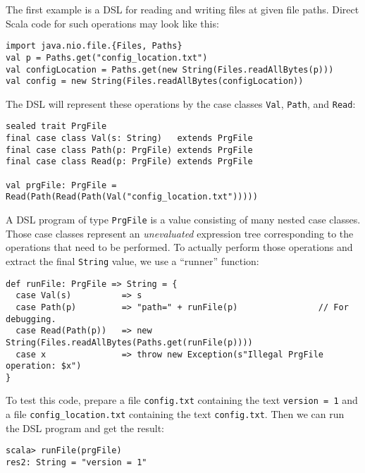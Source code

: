 The first example is a DSL for reading and writing files at given
file paths. Direct Scala code for such operations may look like this:
\begin{lstlisting}
import java.nio.file.{Files, Paths}
val p = Paths.get("config_location.txt")
val configLocation = Paths.get(new String(Files.readAllBytes(p)))
val config = new String(Files.readAllBytes(configLocation))
\end{lstlisting}
The DSL will represent these operations by the case classes \lstinline!Val!,
\lstinline!Path!, and \lstinline!Read!:
\begin{lstlisting}
sealed trait PrgFile
final case class Val(s: String)   extends PrgFile
final case class Path(p: PrgFile) extends PrgFile
final case class Read(p: PrgFile) extends PrgFile

val prgFile: PrgFile = Read(Path(Read(Path(Val("config_location.txt")))))
\end{lstlisting}
A DSL program of type \lstinline!PrgFile!
is a value consisting of many nested case classes. Those case classes
represent an \emph{unevaluated} expression tree corresponding to the
operations that need to be performed. To actually perform those operations
and extract the final \lstinline!String!
value, we use a \textsf{``}runner\textsf{''} function:
\begin{lstlisting}
def runFile: PrgFile => String = {
  case Val(s)          => s
  case Path(p)         => "path=" + runFile(p)                // For debugging.
  case Read(Path(p))   => new String(Files.readAllBytes(Paths.get(runFile(p))))
  case x               => throw new Exception(s"Illegal PrgFile operation: $x")
}
\end{lstlisting}
To test this code, prepare a file \lstinline!config.txt!
containing the text \lstinline!version = 1!
and a file \lstinline!config_location.txt!
containing the text \lstinline!config.txt!.
Then we can run the DSL program and get the result:
\begin{lstlisting}
scala> runFile(prgFile)
res2: String = "version = 1"
\end{lstlisting}

